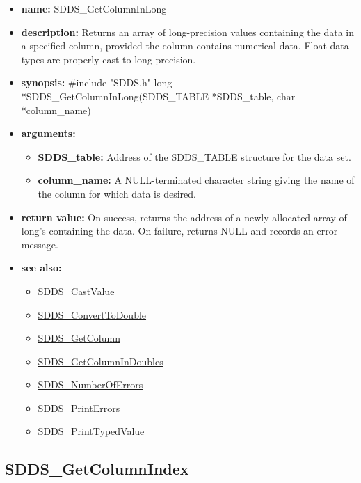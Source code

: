 \documentclass[11pt]{article}
\newcommand{\progref}[1]{\hyperref{SDDS_#1}{{\tt SDDS\_#1} (}{)}{SDDS_#1}}
\begin{document}
\begin{itemize}
\item {\bf name:}\newline
SDDS\_GetColumnInLong
\item {\bf description:}\newline
Returns an array of long-precision values containing the data in a specified column, provided the column contains numerical data. Float data types are properly cast to long precision.
\item {\bf synopsis:} \#include "SDDS.h"\newline
long *SDDS\_GetColumnInLong(SDDS\_TABLE *SDDS\_table, char *column\_name)
\item {\bf arguments:}
\begin{itemize}
\item {\bf SDDS\_table:} Address of the SDDS\_TABLE structure for the data set.
\item {\bf column\_name:} A NULL-terminated character string giving the name of the column for which data is desired.
\end{itemize}
\item {\bf return value:}\newline
On success, returns the address of a newly-allocated array of long's containing the data. On failure, returns NULL and records an error message.
\item {\bf see also:}
\begin{itemize}
\item \progref{CastValue}
\item \progref{ConvertToDouble}
\item \progref{GetColumn}
\item \progref{GetColumnInDoubles}
\item \progref{NumberOfErrors}
\item \progref{PrintErrors}
\item \progref{PrintTypedValue}
\end{itemize}
\end{itemize}

\subsection{SDDS\_GetColumnIndex}
\label{SDDS_GetColumnIndex}
\end{document}
